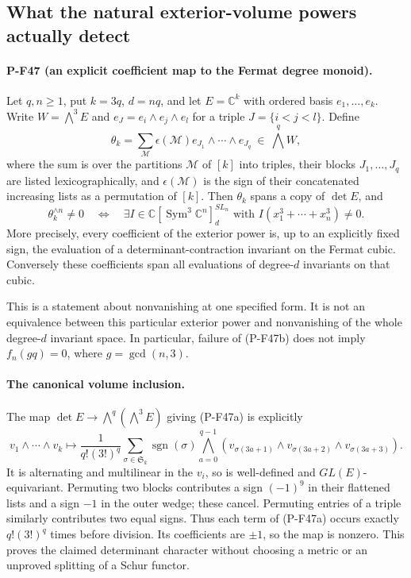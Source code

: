 \documentclass[11pt,a4paper]{article}
\begin{document}
\subsection{What the natural exterior-volume powers actually detect}
\label{sec:exterior-volume-fermat}

\paragraph{P-F47 (an explicit coefficient map to the Fermat degree monoid).}
Let $q,n\ge1$, put $k=3q$, $d=nq$, and let
$E=\mathbb C^k$ with ordered basis $e_1,\ldots,e_k$.
Write $W=\bigwedge^3E$ and $e_J=e_i\wedge e_j\wedge e_l$
for a triple $J=\{i<j<l\}$. Define
\[
 \theta_k=\sum_{\mathcal M}\epsilon(\mathcal M)
                    e_{J_1}\wedge\cdots\wedge e_{J_q}
       \ \in\ \bigwedge^qW,                         \tag{P-F47a}
\]
where the sum is over the partitions $\mathcal M$ of $[k]$
into triples, their blocks $J_1,\ldots,J_q$ are listed
lexicographically, and $\epsilon(\mathcal M)$ is the sign
of their concatenated increasing lists as a permutation
of $[k]$. Then $\theta_k$ spans a copy of $\det E$, and
\[
 \theta_k^{\wedge n}\ne0
 \quad\Longleftrightarrow\quad
 \exists I\in\mathbb C[\operatorname{Sym}^3\mathbb C^n]^{SL_n}_d
             \text{ with }I(x_1^3+\cdots+x_n^3)\ne0.
                                                        \tag{P-F47b}
\]
More precisely, every coefficient of the exterior power
is, up to an explicitly fixed sign, the evaluation of a
determinant-contraction invariant on the Fermat cubic.
Conversely these coefficients span all evaluations of
degree-$d$ invariants on that cubic.

This is a statement about nonvanishing at one specified
form. It is not an equivalence between this particular
exterior power and nonvanishing of the whole degree-$d$
invariant space. In particular, failure of (P-F47b) does
not imply $f_n(gq)=0$, where $g=\gcd(n,3)$.

\paragraph{The canonical volume inclusion.}
The map $\det E\longrightarrow\bigwedge^q(\bigwedge^3E)$
giving (P-F47a) is explicitly
\[
 v_1\wedge\cdots\wedge v_k\longmapsto
 \frac{1}{q!(3!)^q}\sum_{\sigma\in\mathfrak S_k}
 \operatorname{sgn}(\sigma)
 \bigwedge_{a=0}^{q-1}
 (v_{\sigma(3a+1)}\wedge v_{\sigma(3a+2)}
                          \wedge v_{\sigma(3a+3)}).
                                                        \tag{P-F47c}
\]
It is alternating and multilinear in the $v_i$, so is
well-defined and $GL(E)$-equivariant. Permuting two
blocks contributes a sign $(-1)^9$ in their flattened
lists and a sign $-1$ in the outer wedge; these cancel.
Permuting entries of a triple similarly contributes
two equal signs. Thus each term of (P-F47a) occurs
exactly $q!(3!)^q$ times before division. Its coefficients
are $\pm1$, so the map is nonzero. This proves the
claimed determinant character without choosing a
metric or an unproved splitting of a Schur functor.
\end{document}
